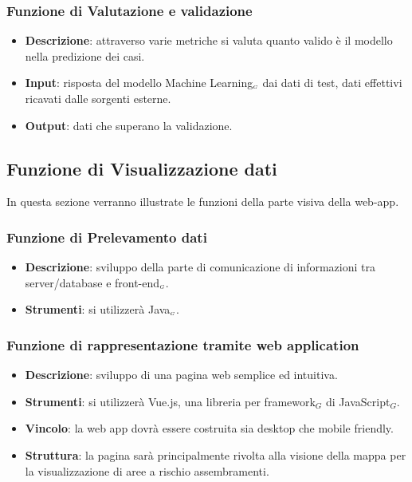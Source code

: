 \subsubsection{Funzione di Valutazione e validazione}\label{DescrizioneGeneraleFunzionalitàDelProdottoFunzioneDiElaborazioneDatiFunzioneDiValutazioneEValidazione}

\begin{itemize}
	\item \textbf{Descrizione}: attraverso varie metriche si valuta quanto valido è il modello nella predizione dei casi.
	\item \textbf{Input}: risposta del modello Machine Learning$_{\scaleto{G}{3pt}}$ dai dati di test, dati effettivi ricavati dalle sorgenti esterne.
	\item \textbf{Output}: dati che superano la validazione.
\end{itemize}

\subsection{Funzione di Visualizzazione dati}\label{DescrizioneGeneraleFunzionalitàDelProdottoFunzioneDiVisualizzazione}
In questa sezione verranno illustrate le funzioni della parte visiva della web-app.

\subsubsection{Funzione di Prelevamento dati}\label{DescrizioneGeneraleFunzionalitàDelProdottoFunzioneDiVisualizzazioneFunzioneDiPrelevamentoDati}

\begin{itemize}
	\item \textbf{Descrizione}: sviluppo della parte di comunicazione di informazioni tra server/database e front-end$_{\scaleto{G}{3pt}}$.
	\item \textbf{Strumenti}: si utilizzerà Java$_{\scaleto{G}{3pt}}$.
\end{itemize}

\subsubsection{Funzione di rappresentazione tramite web application}\label{DescrizioneGeneraleFunzionalitàDelProdottoFunzioneDiVisualizzazioneFunzioneDiRappresentazioneTramiteWebApplication}

\begin{itemize}
	\item \textbf{Descrizione}: sviluppo di una pagina web semplice ed intuitiva.
	\item \textbf{Strumenti}: si utilizzerà Vue.js, una libreria per framework$_G$ di JavaScript$_G$.
	\item \textbf{Vincolo}: la web app dovrà essere costruita sia desktop che mobile friendly.
	\item \textbf{Struttura}: la pagina sarà principalmente rivolta alla visione della mappa per la visualizzazione di aree a rischio assembramenti.
\end{itemize}


